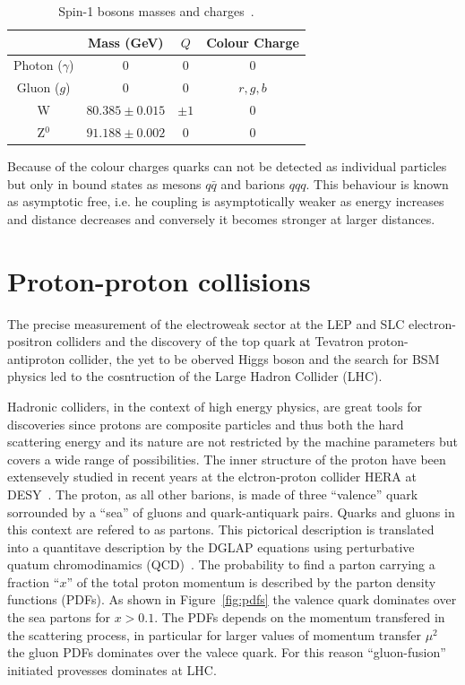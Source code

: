 \begin{table}[ht]
  \begin{center}
    \begin{tabular}{|c|c|c|c|}
    \hline
    & Mass (GeV)
    & $Q$
    & Colour Charge \\
    \hline
      \hline
      Photon ($\gamma$) & 0 & 0 & 0 \\
      Gluon ($g$) & 0 & 0 & $r,g,b$ \\
      W & $80.385 \pm 0.015$ & $\pm 1$ & 0 \\
      Z$^0$ & $91.188 \pm 0.002$ & 0 & 0 \\
    \hline
    \end{tabular}
  \end{center}
  \linespread{1.}
  \caption{Spin-1 bosons masses and charges~\cite{PDG}.}
  \label{tab:bosons}
\end{table}

Because of the colour charges quarks can not be detected as individual particles but
only in bound states as mesons $q\bar{q}$ and barions $qqq$. This behaviour is known as
asymptotic free, i.e. he coupling is asymptotically weaker as energy increases and distance decreases
and conversely it becomes stronger at larger distances.

\section{Proton-proton collisions}
The precise measurement of the electroweak sector at the LEP and SLC electron-positron colliders and the discovery of the top
quark at Tevatron proton-antiproton collider, the yet to be oberved Higgs boson and the search for BSM physics led
to the cosntruction of the Large Hadron Collider (LHC).

Hadronic colliders, in the context of high energy physics, are great tools for discoveries since
protons are composite particles and thus both the hard scattering energy and its nature are not restricted by
the machine parameters but covers a wide range of possibilities.
The inner structure of the proton have been extensevely studied in recent years at the elctron-proton collider HERA
at DESY~\cite{hera}. The proton, as all other barions, is made of three ``valence'' quark sorrounded by a ``sea''
of gluons and quark-antiquark pairs. Quarks and gluons in this context are refered to as partons. 
This pictorical description is translated into a quantitave description by the DGLAP equations using perturbative
quatum chromodinamics (QCD)~\cite{altarelli_parisi,gribov,dokshitzer}.
The probability to find a parton carrying a fraction ``$x$'' of the total proton momentum
is described by the parton density functions (PDFs).
As shown in Figure~\ref{fig:pdfs} the valence quark dominates over the sea partons for $x>0.1$.
The PDFs depends on the momentum transfered in the scattering process, in particular for
larger values of momentum transfer $\mu^2$ the gluon PDFs dominates over the valece quark. For this reason
``gluon-fusion'' initiated provesses dominates at LHC.

